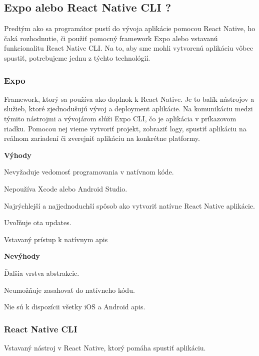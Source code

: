 \subsection{Expo alebo React Native CLI ?}
Predtým ako sa programátor pustí do vývoja aplikácie pomocou React Native, ho čaká rozhodnutie, či použiť pomocný framework Expo alebo vstavanú funkcionalitu React Native CLI. Na to, aby sme mohli vytvorenú aplikáciu vôbec spustiť, potrebujeme jednu z týchto technológií. \\

\subsubsection{Expo}
Framework, ktorý sa používa ako doplnok k React Native. Je to balík nástrojov a služieb, ktoré zjednodušujú vývoj a deployment aplikácie. Na komunikáciu medzi týmito nástrojmi a vývojárom slúži Expo CLI, čo je aplikácia v príkazovom riadku. Pomocou nej vieme vytvoriť projekt, zobraziť logy, spustiť aplikáciu na reálnom zariadení či zverejniť aplikáciu na konkrétne platformy. \cite{expo} \newline

{\bf Výhody}
\begin{itemize}
{\item Nevyžaduje vedomosť programovania v natívnom kóde.}
{\item Nepoužíva Xcode alebo Android Studio.} 
{\item Najrýchlejší a najjednoduchší spôsob ako vytvoriť natívne React Native aplikácie.}
{\item Uvoľňuje \acrshort{ota} updates.} 
{\item Vstavaný prístup k natívnym \acrshort{api}s} \cite{expo}
\end{itemize}

{\bf Nevýhody}
\begin{itemize}
{\item Ďalšia vrstva abstrakcie.} 
{\item Neumožňuje zasahovať do natívneho kódu.}
{\item Nie sú k dispozícii všetky iOS a Android \acrshort{api}s.} \cite{expo}
\end{itemize}
\bigskip

\subsubsection{React Native CLI}
Vstavaný nástroj v React Native, ktorý pomáha spustiť aplikáciu. \newline


